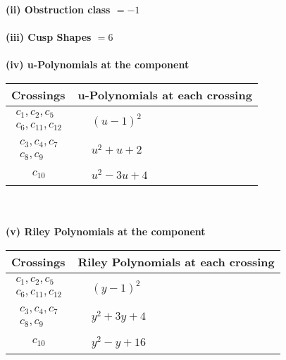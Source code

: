 \documentclass[1p]{elsarticle_modified}
\theoremstyle{definition}
\begin{document}
\flushleft \textbf{(ii) Obstruction class $= -1$}\\~\\
\flushleft \textbf{(iii) Cusp Shapes $= 6$}\\~\\
\newpage\renewcommand{\arraystretch}{1}
\flushleft \textbf{(iv) u-Polynomials at the component}\newline \\
\begin{tabular}{m{50pt}|m{274pt}}
Crossings & \hspace{64pt}u-Polynomials at each crossing \\
\hline $$\begin{aligned}c_{1},c_{2},c_{5}\\c_{6},c_{11},c_{12}\end{aligned}$$&$\begin{aligned}
&(u-1)^2
\end{aligned}$\\
\hline $$\begin{aligned}c_{3},c_{4},c_{7}\\c_{8},c_{9}\end{aligned}$$&$\begin{aligned}
&u^2+u+2
\end{aligned}$\\
\hline $$\begin{aligned}c_{10}\end{aligned}$$&$\begin{aligned}
&u^2-3 u+4
\end{aligned}$\\
\hline
\end{tabular}\\~\\
\newpage\renewcommand{\arraystretch}{1}
\flushleft \textbf{(v) Riley Polynomials at the component}\newline \\
\begin{tabular}{m{50pt}|m{274pt}}
Crossings & \hspace{64pt}Riley Polynomials at each crossing \\
\hline $$\begin{aligned}c_{1},c_{2},c_{5}\\c_{6},c_{11},c_{12}\end{aligned}$$&$\begin{aligned}
&(y-1)^2
\end{aligned}$\\
\hline $$\begin{aligned}c_{3},c_{4},c_{7}\\c_{8},c_{9}\end{aligned}$$&$\begin{aligned}
&y^2+3 y+4
\end{aligned}$\\
\hline $$\begin{aligned}c_{10}\end{aligned}$$&$\begin{aligned}
&y^2- y+16
\end{aligned}$\\
\hline
\end{tabular}\\~\\
\end{document}
